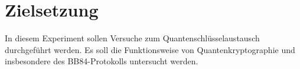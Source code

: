 \section{Zielsetzung}
\label{sec:Zielsetzung}

In diesem Experiment sollen Versuche zum Quantenschlüsselaustausch durchgeführt
werden. Es soll die Funktionsweise von Quantenkryptographie und insbesondere des 
BB84-Protokolls untersucht werden.